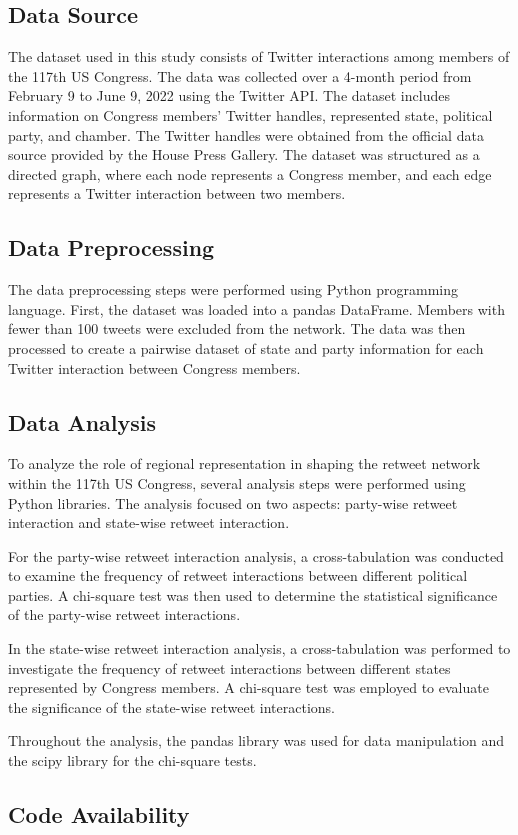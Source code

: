 \documentclass[11pt]{article}
\begin{document}
\subsection*{Data Source}
The dataset used in this study consists of Twitter interactions among members of the 117th US Congress. The data was collected over a 4-month period from February 9 to June 9, 2022 using the Twitter API. The dataset includes information on Congress members' Twitter handles, represented state, political party, and chamber. The Twitter handles were obtained from the official data source provided by the House Press Gallery. The dataset was structured as a directed graph, where each node represents a Congress member, and each edge represents a Twitter interaction between two members.

\subsection*{Data Preprocessing}
The data preprocessing steps were performed using Python programming language. First, the dataset was loaded into a pandas DataFrame. Members with fewer than 100 tweets were excluded from the network. The data was then processed to create a pairwise dataset of state and party information for each Twitter interaction between Congress members.

\subsection*{Data Analysis}
To analyze the role of regional representation in shaping the retweet network within the 117th US Congress, several analysis steps were performed using Python libraries. The analysis focused on two aspects: party-wise retweet interaction and state-wise retweet interaction.

For the party-wise retweet interaction analysis, a cross-tabulation was conducted to examine the frequency of retweet interactions between different political parties. A chi-square test was then used to determine the statistical significance of the party-wise retweet interactions.

In the state-wise retweet interaction analysis, a cross-tabulation was performed to investigate the frequency of retweet interactions between different states represented by Congress members. A chi-square test was employed to evaluate the significance of the state-wise retweet interactions.

Throughout the analysis, the pandas library was used for data manipulation and the scipy library for the chi-square tests.\subsection*{Code Availability}
\end{document}
